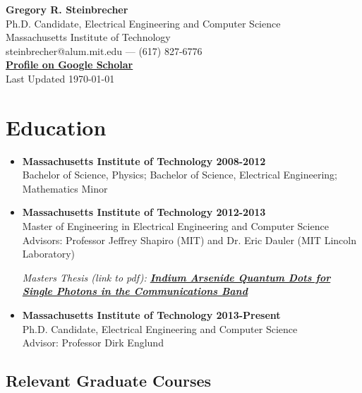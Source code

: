\documentclass[letterpaper,12pt]{article}
\begin{document}
\begin{center}
{\huge \textbf{Gregory R. Steinbrecher}}\\
\vspace{5mm}
{\normalsize Ph.D. Candidate, Electrical Engineering and Computer Science\\
Massachusetts Institute of Technology}\\
{\normalsize steinbrecher@alum.mit.edu --- (617) 827-6776}\\
{\small \href{https://scholar.google.com/citations?user=RPAnJ3cAAAAJ}{\textbf{Profile on Google Scholar}}}\\
\vspace{5mm}
{\small Last Updated \today}\\
\end{center}

\section{Education}

\begin{itemize}

\item \textbf{Massachusetts Institute of Technology 2008-2012}\\
Bachelor of Science, Physics; Bachelor of Science, Electrical Engineering; Mathematics Minor

\item \textbf{Massachusetts Institute of Technology 2012-2013}\\
Master of Engineering in Electrical Engineering and Computer Science\\
Advisors: Professor Jeffrey Shapiro (MIT) and Dr. Eric Dauler (MIT Lincoln Laboratory)

\vspace{0.5em}

{\small \emph{Masters Thesis (link to pdf): \href{http://web.mit.edu/gstein/www/steinbrecher-meng-thesis.pdf}{\textbf{Indium Arsenide Quantum Dots for Single Photons in the Communications Band}}}}

\item \textbf{Massachusetts Institute of Technology 2013-Present}\\
Ph.D. Candidate, Electrical Engineering and Computer Science\\
Advisor: Professor Dirk Englund

\end{itemize}

\subsection{Relevant Graduate Courses}
\end{document}
